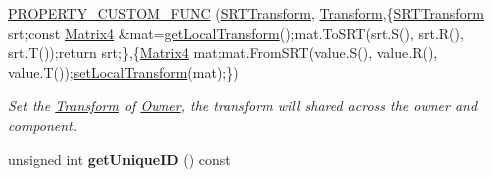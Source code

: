 \begin{DoxyCompactItemize}
\hyperlink{class_i_dream_sky_1_1_component_1_1_owner_a0c60fdcb08bb40240a91751d45636ba0}{P\+R\+O\+P\+E\+R\+T\+Y\+\_\+\+C\+U\+S\+T\+O\+M\+\_\+\+F\+U\+NC} (\hyperlink{class_i_dream_sky_1_1_s_r_t_transform}{S\+R\+T\+Transform}, \hyperlink{class_i_dream_sky_1_1_transform}{Transform},\{\hyperlink{class_i_dream_sky_1_1_s_r_t_transform}{S\+R\+T\+Transform} srt;const \hyperlink{class_i_dream_sky_1_1_matrix4}{Matrix4} \&mat=\hyperlink{class_i_dream_sky_1_1_frame3_a024b5f957cbb324a48e16b264d960410}{get\+Local\+Transform}();mat.\+To\+S\+RT(srt.\+S(), srt.\+R(), srt.\+T());return srt;\},\{\hyperlink{class_i_dream_sky_1_1_matrix4}{Matrix4} mat;mat.\+From\+S\+RT(value.\+S(), value.\+R(), value.\+T());\hyperlink{class_i_dream_sky_1_1_frame3_a83afcd522b770d9f91539a5edd120b71}{set\+Local\+Transform}(mat);\})
\begin{DoxyCompactList}\small\item\em Set the \hyperlink{class_i_dream_sky_1_1_transform}{Transform} of \hyperlink{class_i_dream_sky_1_1_component_1_1_owner}{Owner}, the transform will shared across the owner and component. \end{DoxyCompactList}\item 
unsigned int {\bfseries get\+Unique\+ID} () const \hypertarget{class_i_dream_sky_1_1_component_1_1_owner_a369116f1f6c84117e76a5237376c2f59}{}\label{class_i_dream_sky_1_1_component_1_1_owner_a369116f1f6c84117e76a5237376c2f59}


\end{DoxyCompactItemize}
